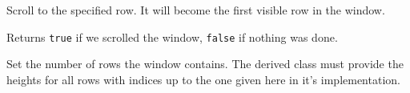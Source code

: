 
Scroll to the specified row. It will become the first visible row in the window.

Returns {\tt true} if we scrolled the window, {\tt false} if nothing was done.


\label{wxvarvscrollhelpersetrowcount}


Set the number of rows the window contains. The derived class must provide the
heights for all rows with indices up to the one given here in it's
 implementation.



